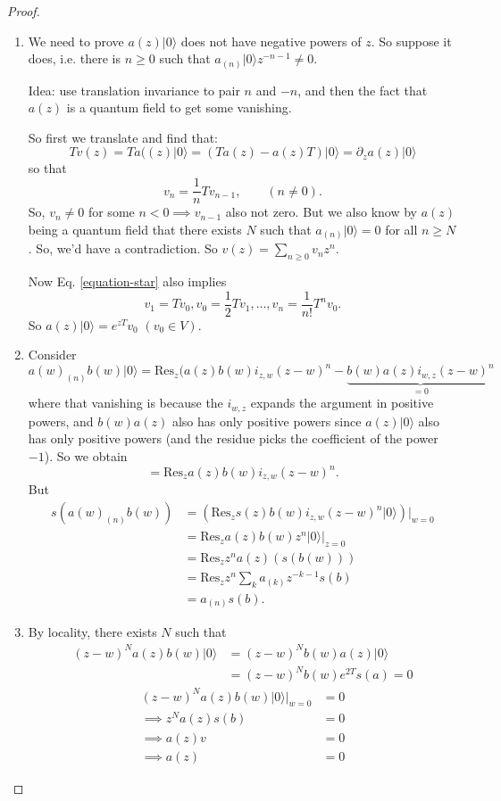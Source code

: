 \begin{proof}
\begin{enumerate}
\item We need to prove $a(z)|0\rangle$ does not have negative
powers of $z$. So suppose it does, i.e. there is $n\geq 0$ such that
$a_{(n)}|0\rangle z^{-n-1}\neq 0$.

Idea: use translation invariance to pair $n$ and $-n$, and
then the fact that $a(z)$ is a quantum field to get some vanishing.

So first we translate and find that: 
$$
Tv(z)=Ta((z)|0\rangle=(Ta(z)-a(z)T)|0\rangle=\partial_z a(z)|0\rangle
$$ 
so that
\begin{equation}
\label{equation-star}
v_n=\frac{1}{n}Tv_{n-1},\qquad (n \neq 0).
\end{equation}
So, $v_n \neq 0$ for some $n<0 \implies v_{n-1}$ also not zero.
But we also know by $a(z)$ being a quantum field
that there exists $N$ such that $a_{(n)}|0\rangle=0$ for all $n \geq N$.
So, we'd have a contradiction.
So $v(z)=\sum_{n \geq 0}v_nz^n$.

Now Eq. \ref{equation-star} also implies
$$
v_1=Tv_0,v_0=\frac{1}{2}Tv_1,\ldots, v_n=\frac{1}{n!}T^nv_0.
$$
So $a(z)|0\rangle=e^{zT}v_0$ $(v_0 \in V)$.

\item Consider 
$$
a(w)_{(n)}b(w)|0\rangle=
\text{Res}_z(a(z)b(w)i_{z,w}(z-w)^n-
\underbrace{b(w)a(z)i_{w,z}(z-w)^n}_{=0}
$$ 
where that vanishing is because the $i_{w,z}$ expands the argument
in positive powers, and $b(w)a(z)$ also has only positive powers
since $a(z)|0\rangle$ also has only positive powers 
(and the residue picks the coefficient of the power  $-1$).
So we obtain
$$
=\text{Res}_za(z)b(w)i_{z,w}(z-w)^n.
$$
But
\begin{align*}
s(a(w)_{(n)}b(w))&=\left(
\text{Res}_zs(z)b(w)i_{z,w}(z-w)^n|0\rangle\right)|_{w=0}\\
&=\text{Res}_za(z)b(w)z^n|0\rangle|_{z=0}\\
&=\text{Res}_z z^n a(z)(s(b(w)))\\
&=\text{Res}_z z^n \sum_{k}a_{(k)}z^{-k-1}s(b)\\
&=a_{(n)}s(b).
\end{align*}

\item By locality, there exists $N$ such that
\begin{align*}
(z-w)^Na(z)b(w) |0\rangle&=(z-w)^Nb(w)a(z)|0\rangle\\
&=(z-w)^Nb(w)e^{2T}s(a)=0
\end{align*}
\begin{align*}
(z-w)^Na(z)b(w)|0\rangle |_{w=0}&=0\\
\implies z^Na(z)s(b)&=0\\
\implies a(z)v&=0\\
\implies a(z)&=0
\end{align*}
\end{enumerate}
\end{proof}

